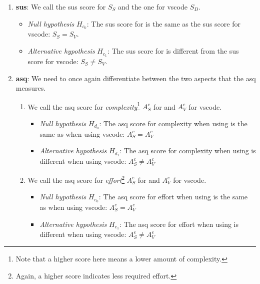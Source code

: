 \documentclass[../thesis]{subfiles}
\begin{document}
\begin{enumerate}[resume,label=\alph*)]
	\item \textbf{\gls{sus}}:
	      We call the \gls{sus} score for \SEE{} $S_S$ and the one for \gls{vscode} $S_D$.
	      \begin{itemize}
		      \item \emph{Null hypothesis} $H_{c_0}$:
		            The \gls{sus} score for \SEE{} is the same as the \gls{sus} score for \gls{vscode}: $S_S = S_V$.
		      \item \emph{Alternative hypothesis} $H_{c_1}$:
		            The \gls{sus} score for \SEE{} is different from the \gls{sus} score for \gls{vscode}: $S_S \neq S_V$.
	      \end{itemize}
	\item \textbf{\gls{asq}}:
	      We need to once again differentiate between the two aspects that the \gls{asq} measures.
	      \begin{enumerate}[label=\roman*)]
		      \item We call the \gls{asq} score for \emph{complexity}\footnote{
			            Note that a higher score here means a lower amount of complexity.
		            } $A^c_S$ for \SEE{} and $A^c_V$ for \gls{vscode}.
		            \begin{itemize}
			            \item \emph{Null hypothesis} $H_{d_0}$:
			                  The \gls{asq} score for complexity when using \SEE{} is the same as when using \gls{vscode}: $A^c_S = A^c_V$
			            \item \emph{Alternative hypothesis} $H_{d_1}$:
			                  The \gls{asq} score for complexity when using \SEE{} is different when using \gls{vscode}: $A^c_S \neq A^c_V$
		            \end{itemize}
		      \item We call the \gls{asq} score for \emph{effort}\footnote{
			            Again, a higher score indicates less required effort.
		            } $A^e_S$ for \SEE{} and $A^e_V$ for \gls{vscode}.
		            \begin{itemize}
			            \item \emph{Null hypothesis} $H_{e_0}$:
			                  The \gls{asq} score for effort when using \SEE{} is the same as when using \gls{vscode}: $A^e_S = A^e_V$
			            \item \emph{Alternative hypothesis} $H_{e_1}$:
			                  The \gls{asq} score for effort when using \SEE{} is different when using \gls{vscode}: $A^e_S \neq A^e_V$
		            \end{itemize}
	      \end{enumerate}
\end{enumerate}
\end{document}
